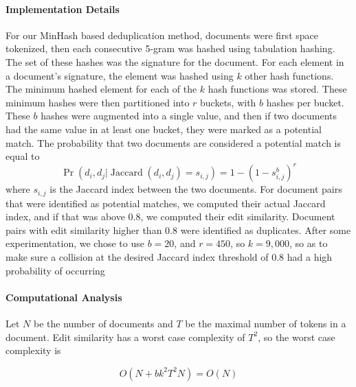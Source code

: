 \paragraph{Implementation Details}
\label{section:minhash_details}
For our MinHash based deduplication method, documents were first space tokenized, then each consecutive 5-gram was hashed using tabulation hashing.
The set of these hashes was the signature for the document.
For each element in a document's signature, the element was hashed using $k$ other hash functions.
The minimum hashed element for each of the $k$ hash functions was stored.
These minimum hashes were then partitioned into $r$ buckets, with $b$ hashes per bucket.
These $b$ hashes were augmented into a single value, and then if two documents had the same value in at least one bucket, they were marked as a potential match.
The probability that two documents are considered a potential match is equal to
\begin{equation}
\operatorname{Pr}(d_i, d_j | \operatorname{Jaccard}(d_i, d_j) = s_{i, j}) = 1 - (1 - s_{i, j}^b)^r
\end{equation}
where $s_{i,j}$ is the Jaccard index between the two documents.
For document pairs that were identified as potential matches, we computed their actual Jaccard index, and if that was above 0.8, we computed their edit similarity.
Document pairs with edit similarity higher than 0.8 were identified as duplicates.
After some experimentation, we chose to use $b=20$, and $r=450$, so $k=9,000$, so as to make sure a collision at the desired Jaccard index threshold of 0.8 had a high probability of occurring

\paragraph{Computational Analysis}

Let $N$ be the number of documents and $T$ be the maximal number of tokens in a document. Edit similarity has a worst case complexity of $T^2$, so the worst case complexity is

\begin{equation}
    O(N + b k^{2} T^{2} N) = O(N)
\end{equation}


